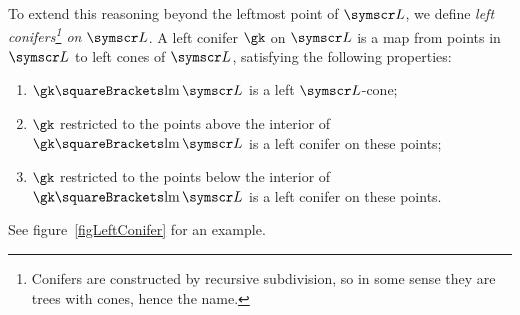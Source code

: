 \documentclass[10pt, a4paper, twoside]{basestyle}
\DeclareMathOperator{\leftmost}{lm}
\newcommand{\pointset}{\symscr}
\begin{document}
To extend this reasoning beyond the leftmost point of $\pointset L$, we define \emph{left conifers\footnote{Conifers are
constructed by recursive subdivision, so in some sense they are trees with cones, hence the name.}
on $\pointset L$}.
A left conifer $\gk$ on $\pointset L$ is a map from points in $\pointset L$ to left
cones of $\pointset L$,
satisfying the following properties:
\begin{enumerate}
\item $\gk\of{\leftmost\pointset L}$ is a left $\pointset L$-cone;
\item $\gk$ restricted to the points above the interior of $\gk\of{\leftmost\pointset L}$ is a left conifer on these points;
\item $\gk$ restricted to the points below the interior of $\gk\of{\leftmost\pointset L}$ is a left conifer on these points.
\end{enumerate}
See figure~\ref{figLeftConifer} for an example.
\end{document}
